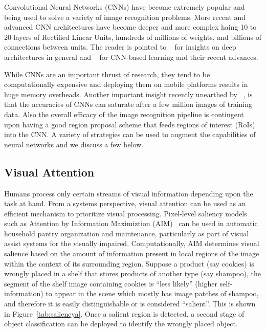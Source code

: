 
Convolutional Neural Networks (CNNs) have become extremely popular and being used to solve a variety of image recognition problems. 
More recent and advanced CNN architectures have become deeper and more complex haing 10 to 20 
layers of Rectified Linear Units, hundreds of millions of weights, and billions of connections between units.
The reader is pointed to ~\cite{Bengio2009} for insights on deep architectures in general and ~\cite{DNNNature2015} for CNN-based learning and their recent advances.

While CNNs are an important thrust of research, they tend to be computationally expensive and deploying them on mobile platforms results in huge memory overheads. 
Another important insight recently unearthed by ~\cite{facenet}, is that the accuracies of CNNs can saturate after a few million images of training data.
Also the overall efficacy of the image recognition pipeline is contingent upon having a good region proposal scheme that feeds regions of interest (RoIs) into the CNN. 
A variety of strategies can be used to augment the capabilities of neural networks and we discuss a few below.

\subsection{Visual Attention}
Humans process only certain streams of visual information depending upon the task at hand. 
From a systems perspective, visual attention can be used as an efficient mechanism to prioritize visual processing.  
Pixel-level saliency models such as Attention by Information Maximiztion (AIM)~\cite{Bruceb} can be used in 
automatic household pantry organization and maintenance, particularly 
as part of visual assist systems for the visually impaired. Computationally, AIM determines visual salience based on the amount of information present in 
local regions of the image within the context of its surrounding region. 
Suppose a product (say cookies) is wrongly placed in a shelf that stores products of another type (say shampoo), the segment of the shelf image containing cookies is 
``less likely'' (higher self-information) to appear in the scene which mostly has image patches of shampoo, 
and therefore it is easily distinguishable or is considered ``salient''. This is shown in Figure~\ref{tab:saliencya}.
Once a salient region is detected, a second stage of object classification can be deployed to identify the wrongly placed object.  

